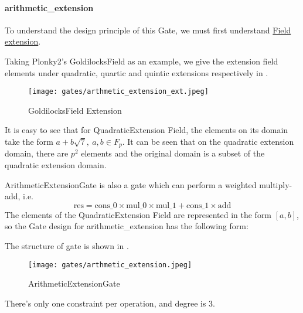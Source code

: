 \paragraph{arithmetic\_extension}

To understand the design principle of this Gate, we must first understand \href{https://en.wikipedia.org/wiki/Field_extension#Extension_field}{Field extension}. 


Taking Plonky2's GoldilocksField as an example, we give the extension field elements under quadratic, quartic and quintic extensions respectively in .

\begin{figure}[!ht]
    \centering
    \texttt{[image: gates/arthmetic\_extension\_ext.jpeg]}
    \caption{GoldilocksField Extension}
    \label{fig:goldilocksfield-extension}
\end{figure}

It is easy to see that for QuadraticExtension Field, the elements on its domain take the form $a+b\sqrt{7}, \ a,b \in F_p$.
It can be seen that on the quadratic extension domain, there are $p^2$ elements and the original domain is a subset of the quadratic extension domain.

ArithmeticExtensionGate is also a gate which can perform a weighted multiply-add, i.e.
\[ \text{res} = \text{cons\_0} \times \text{mul\_0} \times \text{mul\_1} + \text{cons\_1} \times \text{add} \]
The elements of the QuadraticExtension Field are represented in the form $[a, b]$, so the Gate design for arithmetic\_extension has the following form:

The structure of gate is shown in .
\begin{figure}[!ht]
    \centering
    \texttt{[image: gates/arthmetic\_extension.jpeg]}
    \caption{ArithmeticExtensionGate}
    \label{fig:arthmetic-extension}
\end{figure}

There's only one constraint per operation, and degree is 3.
